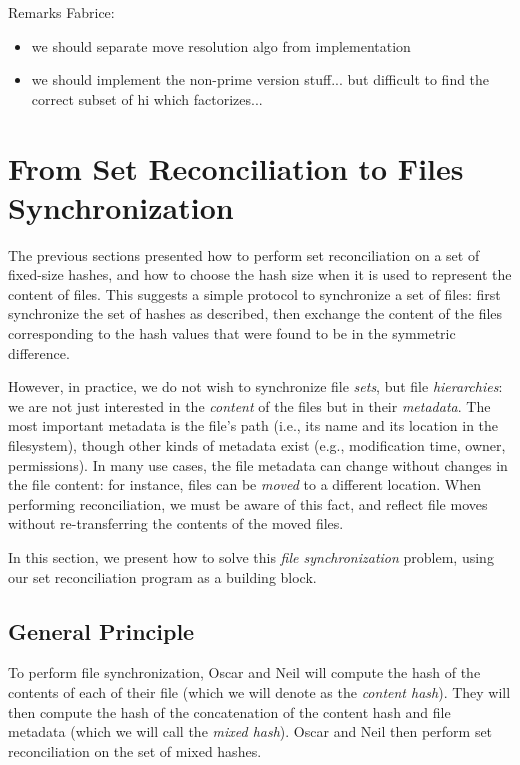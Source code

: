 \documentclass[11pt]{llncs}
\begin{document}
Remarks Fabrice:
\begin{itemize}
\item we should separate move resolution algo from implementation
\item we should implement the non-prime version stuff... but difficult to find the correct subset of hi which factorizes...
\end{itemize}

\section{From Set Reconciliation to Files Synchronization}
\label{files}

The previous sections presented how to perform set reconciliation on a set of
fixed-size hashes, and how to choose the hash size when it is used to represent
the content of files. This suggests a simple protocol to synchronize a set of
files: first synchronize the set of hashes as described, then exchange the
content of the files corresponding to the hash values that were found to be in
the symmetric difference.

However, in practice, we do not wish to synchronize file \emph{sets}, but file
\emph{hierarchies}: we are not just interested in the \emph{content} of the
files but in their \emph{metadata}. The most important metadata is the file's
path (i.e., its name and its location in the filesystem), though other kinds of
metadata exist (e.g., modification time, owner, permissions). In many use cases,
the file metadata can change without changes in the file content: for instance,
files can be \emph{moved} to a different location. When performing
reconciliation, we must be aware of this fact, and reflect file moves without
re-transferring the contents of the moved files.

In this section, we present how to solve this \emph{file synchronization}
problem, using our set reconciliation program as a building block.

\subsection{General Principle}

To perform file synchronization, Oscar and Neil will compute the hash of the
contents of each of their file (which we will denote as the \emph{content
hash}). They will then compute the hash of the concatenation of the content hash
and file metadata (which we will call the \emph{mixed hash}). Oscar and Neil
then perform set reconciliation on the set of mixed hashes.
\end{document}
